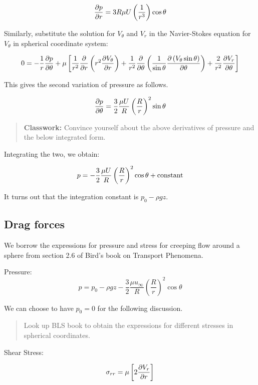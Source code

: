 $$ {\partial p \over \partial r} = {3 R \mu U } \left( 1 \over r^3 \right) \cos\theta $$

Similarly, substitute the solution for $V_\theta$ and $V_r$ in the Navier-Stokes equation for $V_\theta$ in spherical coordinate system:

$$ 0 = - {1 \over r} {\partial p \over \partial \theta} + \mu \left[ {1 \over r^2} {\partial \over \partial r} \left( r^2 {\partial V_\theta \over \partial r} \right) + {1 \over r^2}{\partial \over \partial \theta} \left( {1 \over \sin \theta} {\partial \left( V_\theta \sin\theta\right) \over \partial \theta} \right) + {2 \over r^2} {\partial V_r \over \partial \theta } \right] $$

This gives the second variation of pressure as follows.

$$ {\partial p \over \partial \theta} = {3 \over 2} {\mu U \over R} \left( R \over r \right)^2 \sin \theta $$

\begin{quote}
{\bf Classwork:} Convince yourself about the above derivatives of pressure and the below integrated form.
\end{quote}

Integrating the two, we obtain:

$$ p = - {3 \over 2} {\mu U \over R} \left( R \over r \right)^2 \cos \theta + \text{constant}$$

It turns out that the integration constant is $p_0 - \rho g z$.



\subsection{Drag forces}

We borrow the expressions for pressure and stress for creeping flow around a
sphere from section 2.6 of Bird's book on Transport Phenomena.

Pressure: 
$$p = p_0 - \rho g z - \frac{3}{2} \frac{\mu u_\infty}{R}
\left(\frac{R}{r}\right)^2 \cos\theta$$

We can choose to have $p_0 = 0$ for the following discussion.

\begin{quote}
Look up BLS book to obtain the expressions for different stresses in spherical coordinates.
\end{quote}

Shear Stress:

$$ \sigma_{rr} = \mu \left[ 2 { \partial V_r \over \partial r} \right] $$

